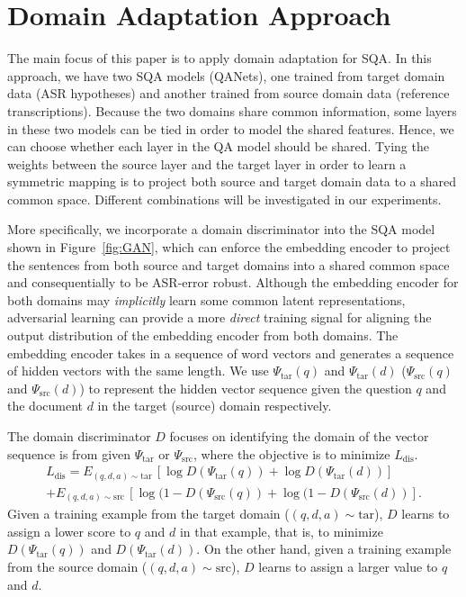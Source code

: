 \documentclass{article}
\begin{document}
\section{Domain Adaptation Approach}
\label{sec:pagestyle}
The main focus of this paper is to apply domain adaptation for SQA.
In this approach, we have two SQA models (QANets), one trained from  target domain data (ASR hypotheses) and another trained from source domain data (reference transcriptions).
Because the two domains share common information, some layers in these two models can be tied in order to model the shared features. 
Hence, we can choose whether each layer in the QA model should be shared. 
Tying the weights between the source layer and the target layer in order to learn a symmetric mapping is to project both source and target domain data to a shared common space. 
Different combinations will be investigated in our experiments.

More specifically, we incorporate a domain discriminator into the SQA model shown in Figure~\ref{fig:GAN}, which can enforce the embedding encoder to project the sentences from both source and target domains into a shared common space and consequentially to be ASR-error robust.
Although the embedding encoder for both domains may \emph{implicitly} learn some common latent representations,  adversarial learning can provide a more \emph{direct} training signal for aligning the output distribution of the embedding encoder  from both domains.
The embedding encoder takes in a sequence of word vectors and generates a sequence of hidden vectors with the same length.
We use $\Psi_\text{tar}(q)$ and $\Psi_\text{tar}(d)$ ($\Psi_\text{src}(q)$ and $\Psi_\text{src}(d)$) to represent the hidden vector sequence given the question $q$ and the document $d$ in the target (source) domain respectively.

The domain discriminator $D$ focuses on identifying the domain of the vector sequence is from given $\Psi_\text{tar}$ or $\Psi_\text{src}$, where the objective is to minimize $L_\text{dis}$.
\begin{eqnarray}
\label{eq2}
L_\text{dis}  = E_{(q,d,a) \sim \text{tar}}  \,[\log D(\Psi_\text{tar}(q))+\log D(\Psi_\text{tar}(d))] \\
+ E_{(q,d,a) \sim \text{src}} \, [\log (1 -  D(\Psi_\text{src}(q))+\log (1 -  D(\Psi_\text{src}(d))]. \nonumber
\end{eqnarray}
Given a training example from the target domain ($(q,d,a) \sim \text{tar}$), $D$ learns to assign a lower score to $q$ and $d$ in that example, that is, to minimize $D(\Psi_\text{tar}(q))$ and $D(\Psi_\text{tar}(d))$.  
On the other hand, given a training example from the source domain ($(q,d,a) \sim \text{src}$), $D$ learns to assign a larger value to $q$ and $d$.
\end{document}
